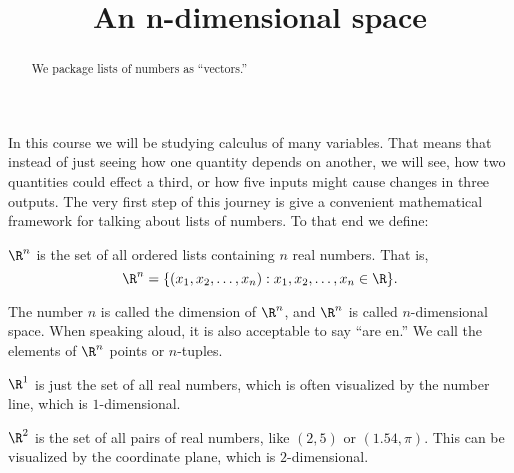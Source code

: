 \documentclass{ximera}
\title{An n-dimensional space}
\begin{document}
\begin{abstract}
  We package lists of numbers as ``vectors.''
\end{abstract}

In this course we will be studying calculus of many variables.  That
means that instead of just seeing how one quantity depends on another,
we will see, how two quantities could effect a third, or how five
inputs might cause changes in three outputs.  The very first step of
this journey is give a convenient mathematical framework for talking
about lists of numbers.  To that end we define:

\begin{definition}
  $\R^n$ is the set of all ordered lists containing $n$ real numbers.
  That is, \[\R^n = \{ (x_1,x_2,\dots, x_n) : x_1,x_2,\dots, x_n \in \R
  \}.\]
\end{definition}

The number $n$ is called the dimension of $\R^n$, and $\R^n$ is called $n$-dimensional space.  When speaking aloud, it is also acceptable to say ``are en.''
 We call the elements of $\R^n$ points or $n$-tuples.

\begin{example}
  $\R^1$ is just the set of all real numbers, which is often visualized by the number line, which is $1$-dimensional.
\end{example}

\begin{example}
	$\R^2$ is the set of all pairs of real numbers, like $(2,5)$ or $(1.54,\pi)$. This can be visualized by the coordinate plane, which is $2$-dimensional.
\end{example}
	
\end{document}
